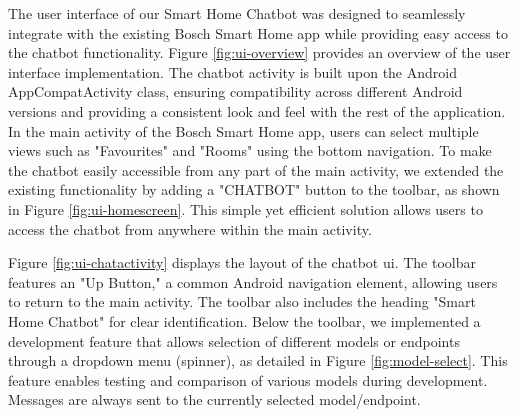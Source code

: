 The user interface of our Smart Home Chatbot was designed to seamlessly integrate with the existing Bosch Smart Home app while providing easy access to the chatbot functionality. Figure \ref{fig:ui-overview} provides an overview of the user interface implementation.
The chatbot activity is built upon the Android AppCompatActivity class, ensuring compatibility across different Android versions and providing a consistent look and feel with the rest of the application.
In the main activity of the Bosch Smart Home app, users can select multiple views such as "Favourites" and "Rooms" using the bottom navigation. To make the chatbot easily accessible from any part of the main activity, we extended the existing functionality by adding a "CHATBOT" button to the toolbar, as shown in Figure \ref{fig:ui-homescreen}. This simple yet efficient solution allows users to access the chatbot from anywhere within the main activity.

Figure \ref{fig:ui-chatactivity} displays the layout of the chatbot \gls{ui}. The toolbar features an "Up Button," a common Android navigation element, allowing users to return to the main activity. The toolbar also includes the heading "Smart Home Chatbot" for clear identification.
Below the toolbar, we implemented a development feature that allows selection of different models or endpoints through a dropdown menu (spinner), as detailed in Figure \ref{fig:model-select}. This feature enables testing and comparison of various models during development. Messages are always sent to the currently selected model/endpoint.

